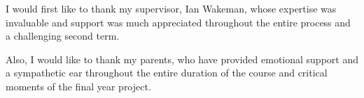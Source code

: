 
\begin{acknowledgements}

I would first like to thank my supervisor, Ian Wakeman, whose expertise was invaluable and support was much appreciated throughout the entire process and a challenging second term. \newline \par

Also, I would like to thank my parents, who have provided emotional support and a sympathetic ear throughout the entire duration of the course and critical moments of the final year project.

\end{acknowledgements}